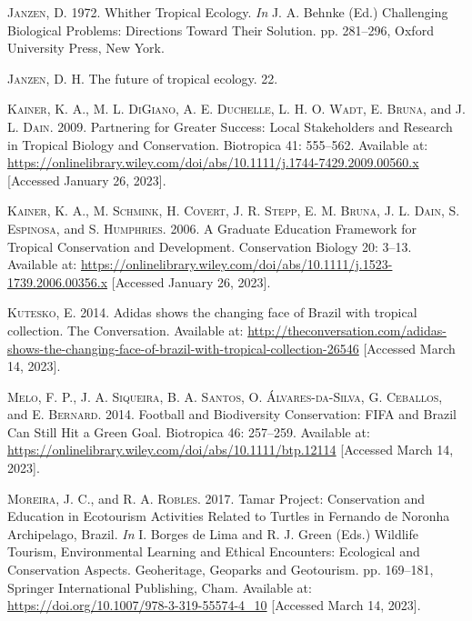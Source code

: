 \documentclass[
  12pt,
  man, donotrepeattitle]{apa6}
\newlength{\cslhangindent}
\newlength{\cslentryspacingunit} %
\newenvironment{CSLReferences}[2] %
 {%
  \setlength{\parindent}{0pt}
  \ifodd #1
  \let\oldpar\par
  \def\par{\hangindent=\cslhangindent\oldpar}
  \fi
  \setlength{\parskip}{#2\cslentryspacingunit}
 }%
 {}
\begin{document}
\begin{CSLReferences}{1}{0}
\leavevmode{}%
\textsc{Janzen, D.} 1972. Whither {Tropical} {Ecology}. \emph{In} J. A. Behnke (Ed.) Challenging {Biological} {Problems}: {Directions} {Toward} {Their} {Solution}. pp. 281--296, Oxford University Press, New York.

\leavevmode{}%
\textsc{Janzen, D. H.} The future of tropical ecology. 22.

\leavevmode{}%
\textsc{Kainer, K. A.}, \textsc{M. L. DiGiano}, \textsc{A. E. Duchelle}, \textsc{L. H. O. Wadt}, \textsc{E. Bruna}, and \textsc{J. L. Dain}. 2009. Partnering for {Greater} {Success}: {Local} {Stakeholders} and {Research} in {Tropical} {Biology} and {Conservation}. Biotropica 41: 555--562. Available at: \url{https://onlinelibrary.wiley.com/doi/abs/10.1111/j.1744-7429.2009.00560.x} {[}Accessed January 26, 2023{]}.

\leavevmode{}%
\textsc{Kainer, K. A.}, \textsc{M. Schmink}, \textsc{H. Covert}, \textsc{J. R. Stepp}, \textsc{E. M. Bruna}, \textsc{J. L. Dain}, \textsc{S. Espinosa}, and \textsc{S. Humphries}. 2006. A {Graduate} {Education} {Framework} for {Tropical} {Conservation} and {Development}. Conservation Biology 20: 3--13. Available at: \url{https://onlinelibrary.wiley.com/doi/abs/10.1111/j.1523-1739.2006.00356.x} {[}Accessed January 26, 2023{]}.

\leavevmode{}%
\textsc{Kutesko, E.} 2014. Adidas shows the changing face of {Brazil} with tropical collection. The Conversation. Available at: \url{http://theconversation.com/adidas-shows-the-changing-face-of-brazil-with-tropical-collection-26546} {[}Accessed March 14, 2023{]}.

\leavevmode{}%
\textsc{Melo, F. P.}, \textsc{J. A. Siqueira}, \textsc{B. A. Santos}, \textsc{O. Álvares-da-Silva}, \textsc{G. Ceballos}, and \textsc{E. Bernard}. 2014. Football and {Biodiversity} {Conservation}: {FIFA} and {Brazil} {Can} {Still} {Hit} a {Green} {Goal}. Biotropica 46: 257--259. Available at: \url{https://onlinelibrary.wiley.com/doi/abs/10.1111/btp.12114} {[}Accessed March 14, 2023{]}.

\leavevmode{}%
\textsc{Moreira, J. C.}, and \textsc{R. A. Robles}. 2017. Tamar {Project}: {Conservation} and {Education} in {Ecotourism} {Activities} {Related} to {Turtles} in {Fernando} de {Noronha} {Archipelago}, {Brazil}. \emph{In} I. Borges de Lima and R. J. Green (Eds.) Wildlife {Tourism}, {Environmental} {Learning} and {Ethical} {Encounters}: {Ecological} and {Conservation} {Aspects}. Geoheritage, {Geoparks} and {Geotourism}. pp. 169--181, Springer International Publishing, Cham. Available at: \url{https://doi.org/10.1007/978-3-319-55574-4_10} {[}Accessed March 14, 2023{]}.


\end{CSLReferences}
\end{document}
